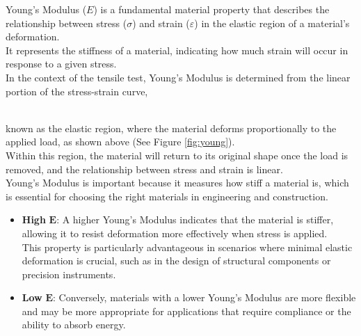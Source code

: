 \documentclass{article}
\begin{document}
{\begin{minipage}{\dimexpr\textwidth-0.55\textwidth\relax}
    {Young's Modulus} ($E$) is a fundamental material property that describes the relationship between stress ($\sigma$) and strain ($\varepsilon$) in the elastic region of a material's deformation.\\[8pt]
    It represents the stiffness of a material, indicating how much strain will occur in response to a given stress.\\
    
    In the context of the tensile test, Young's Modulus is determined from the linear portion of the stress-strain curve,
\end{minipage}}\\[4pt]
    known as the elastic region, where the material deforms proportionally to the applied load, as shown above (See Figure \ref{fig:young}).\\[8pt]
    Within this region, the material will return to its original shape once the load is removed, and the relationship between stress and strain is linear.\\[8pt]
    Young's Modulus is important because it measures how stiff a material is, which is essential for choosing the right materials in engineering and construction.
    \begin{itemize}[itemsep=-0.5mm]
        \item \textbf{High }\(\bm{E}\): A higher Young's Modulus indicates that the material is stiffer, allowing it to resist deformation more effectively when stress is applied.\\[3pt] 
        This property is particularly advantageous in scenarios where minimal elastic deformation is crucial, such as in the design of structural components or precision instruments.
        \item \textbf{Low }\(\bm{E}\): Conversely, materials with a lower Young's Modulus are more flexible and may be more appropriate for applications that require compliance or the ability to absorb energy.
    \end{itemize}    

    \newpage
\end{document}
